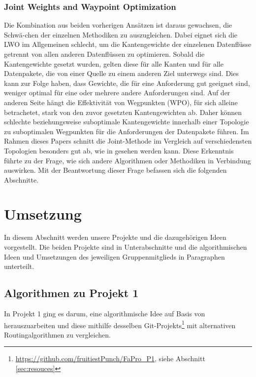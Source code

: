 \documentclass[sigconf, nonacm, review]{acmart}
\begin{document}
\subsubsection{Joint Weights and Waypoint Optimization}
Die Kombination aus beiden vorherigen Ans\"atzen ist daraus gewachsen, 
die Schw\"a-chen der einzelnen Methodiken zu auszugleichen.
Dabei eignet sich die LWO im Allgemeinen schlecht, 
um die Kantengewichte der einzelenen Datenfl\"usse getrennt von allen anderen Datenfl\"ussen zu optimieren.
Sobald die Kantengewichte gesetzt wurden, gelten diese f\"ur alle Kanten und f\"ur alle Datenpakete, 
die von einer Quelle zu einem anderen Ziel unterwegs sind.
Dies kann zur Folge haben, dass Gewichte, die f\"ur eine Anforderung gut geeignet sind, weniger optimal f\"ur eine oder mehrere andere Anforderungen sind.
Auf der anderen Seite h\"angt die Effektivit\"at von Wegpunkten (WPO), 
f\"ur sich alleine betrachetet, stark von den zuvor gesetzten Kantengewichten ab.
Daher k\"onnen schlechte beziehungsweise suboptimale Kantengewichte innerhalb einer Topologie zu suboptimalen Wegpunkten f\"ur die Anforderungen der Datenpakete f\"uhren.
Im Rahmen dieses Papers schnitt die Joint-Methode im Vergleich auf verschiedensten Topologien besonders gut ab, 
wie in \cite{foerster2021} gesehen werden kann.
Diese Erkenntnis f\"uhrte zu der Frage, 
wie sich andere Algorithmen oder Methodiken in Verbindung auswirken. 
Mit der Beantwortung dieser Frage befassen sich die folgenden Abschnitte.

\section{Umsetzung}
In diesem Abschnitt werden unsere Projekte und die dazugeh\"origen Ideen vorgestellt.
Die beiden Projekte sind in Unterabschnitte und die algorithmischen Ideen und Umsetzungen des jeweiligen Gruppenmitglieds in Paragraphen unterteilt. 
\subsection{Algorithmen zu Projekt 1}
In Projekt 1 ging es darum, eine algorithmische Idee auf Basis von \cite{foerster2021} herauszuarbeiten und diese mithilfe desselben Git-Projekts\footnote{\url{https://github.com/fruitiestPunch/FaPro_P1}, siehe Abschnitt \ref{sec:resouces}} mit alternativen Routingalgorithmen zu vergleichen. 
\end{document}
